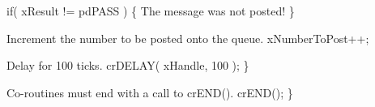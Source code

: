 \begin{DoxyPre}        if( xResult != pdPASS )
        \{
The message was not posted!
        \}\end{DoxyPre}



\begin{DoxyPre}Increment the number to be posted onto the queue.
        xNumberToPost++;\end{DoxyPre}



\begin{DoxyPre}Delay for 100 ticks.
        crDELAY( xHandle, 100 );
    \}\end{DoxyPre}



\begin{DoxyPre}Co-routines must end with a call to crEND().
    crEND();
 \}\end{DoxyPre}
 